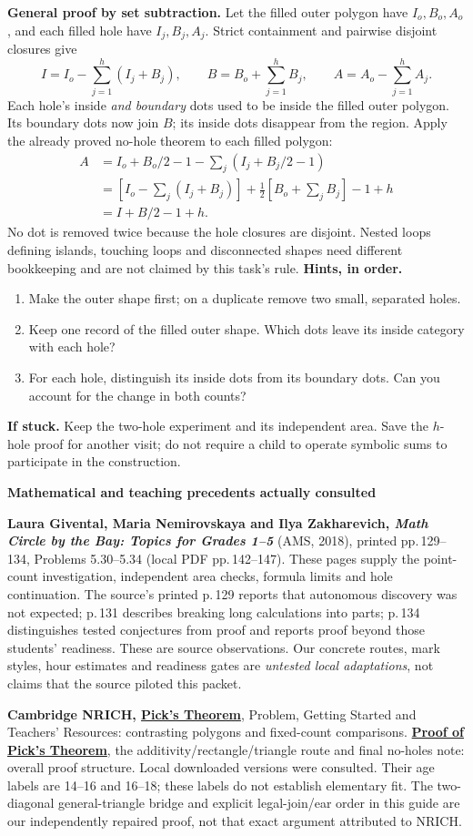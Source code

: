 \documentclass[letterpaper,11pt]{article}
\newcommand{\heading}[1]{\vspace{3pt}{\large\bfseries #1}\par}
\newcommand{\subhead}[1]{\vspace{2pt}\textbf{#1}\par}
\newcommand{\hints}[3]{\textbf{Hints, in order.}\begin{enumerate}\item #1\item #2\item #3\end{enumerate}}
\begin{document}
\textbf{General proof by set subtraction.} Let the filled outer polygon have $I_o,B_o,A_o$, and each filled hole have $I_j,B_j,A_j$. Strict containment and pairwise disjoint closures give
\[I=I_o-\sum_{j=1}^{h}(I_j+B_j),\qquad B=B_o+\sum_{j=1}^{h}B_j,\qquad A=A_o-\sum_{j=1}^{h}A_j.\]
Each hole's inside \emph{and boundary} dots used to be inside the filled outer polygon. Its boundary dots now join $B$; its inside dots disappear from the region. Apply the already proved no-hole theorem to each filled polygon:
\begin{align*}
A&=I_o+B_o/2-1-\sum_j(I_j+B_j/2-1)\\
 &=\left[I_o-\sum_j(I_j+B_j)\right]+\tfrac12\left[B_o+\sum_jB_j\right]-1+h\\
 &=I+B/2-1+h.
\end{align*}
No dot is removed twice because the hole closures are disjoint. Nested loops defining islands, touching loops and disconnected shapes need different bookkeeping and are not claimed by this task's rule.
\hints{Make the outer shape first; on a duplicate remove two small, separated holes.}{Keep one record of the filled outer shape. Which dots leave its inside category with each hole?}{For each hole, distinguish its inside dots from its boundary dots. Can you account for the change in both counts?}
\textbf{If stuck.} Keep the two-hole experiment and its independent area. Save the $h$-hole proof for another visit; do not require a child to operate symbolic sums to participate in the construction.
\newpage

\heading{Sources, provenance and what to keep after the session}
\subhead{Mathematical and teaching precedents actually consulted}
\textbf{Laura Givental, Maria Nemirovskaya and Ilya Zakharevich, \emph{Math Circle by the Bay: Topics for Grades 1--5}} (AMS, 2018), printed pp.\,129--134, Problems 5.30--5.34 (local PDF pp.\,142--147). These pages supply the point-count investigation, independent area checks, formula limits and hole continuation. The source's printed p.\,129 reports that autonomous discovery was not expected; p.\,131 describes breaking long calculations into parts; p.\,134 distinguishes tested conjectures from proof and reports proof beyond those students' readiness. These are source observations. Our concrete routes, mark styles, hour estimates and readiness gates are \emph{untested local adaptations}, not claims that the source piloted this packet.

\textbf{Cambridge NRICH, \href{https://nrich.maths.org/problems/picks-theorem}{Pick's Theorem}}, Problem, Getting Started and Teachers' Resources: contrasting polygons and fixed-count comparisons. \textbf{\href{https://nrich.maths.org/problems/proof-picks-theorem}{Proof of Pick's Theorem}}, the additivity/rectangle/triangle route and final no-holes note: overall proof structure. Local downloaded versions were consulted. Their age labels are 14--16 and 16--18; these labels do not establish elementary fit. The two-diagonal general-triangle bridge and explicit legal-join/ear order in this guide are our independently repaired proof, not that exact argument attributed to NRICH.
\end{document}

